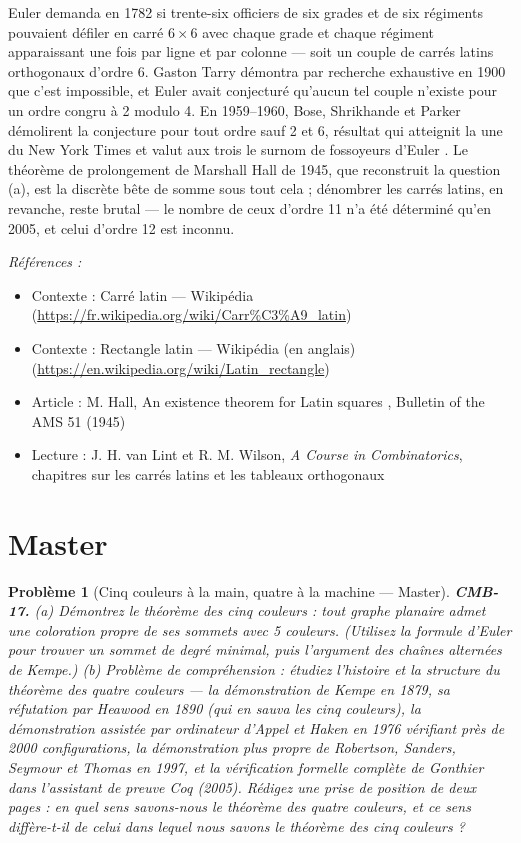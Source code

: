 \documentclass[11pt]{article}
\newtheorem{problem}{Problème}
\newenvironment{refs}{\par\small\noindent\emph{Références :}\begin{itemize}\setlength\itemsep{0pt}}{\end{itemize}\normalsize}
\begin{document}
\noindent Euler demanda en 1782 si trente-six officiers de six grades et de six régiments pouvaient défiler en carré $ 6 \times 6 $ avec chaque grade et chaque régiment apparaissant une fois par ligne et par colonne --- soit un couple de carrés latins orthogonaux d'ordre 6. Gaston Tarry démontra par recherche exhaustive en 1900 que c'est impossible, et Euler avait conjecturé qu'aucun tel couple n'existe pour un ordre congru à 2 modulo 4. En 1959--1960, Bose, Shrikhande et Parker démolirent la conjecture pour tout ordre sauf 2 et 6, résultat qui atteignit la une du New York Times et valut aux trois le surnom de \og{} fossoyeurs d'Euler \fg{}. Le théorème de prolongement de Marshall Hall de 1945, que reconstruit la question (a), est la discrète bête de somme sous tout cela ; dénombrer les carrés latins, en revanche, reste brutal --- le nombre de ceux d'ordre 11 n'a été déterminé qu'en 2005, et celui d'ordre 12 est inconnu.

\begin{refs}
\item Contexte : Carré latin --- Wikipédia (\url{https://fr.wikipedia.org/wiki/Carr%C3%A9_latin})
\item Contexte : Rectangle latin --- Wikipédia (en anglais) (\url{https://en.wikipedia.org/wiki/Latin_rectangle})
\item Article : M. Hall, \og{} An existence theorem for Latin squares \fg{}, Bulletin of the AMS 51 (1945)
\item Lecture : J. H. van Lint et R. M. Wilson, \textit{A Course in Combinatorics}, chapitres sur les carrés latins et les tableaux orthogonaux
\end{refs}

\bigskip


\section*{Master}

\begin{problem}[{Cinq couleurs à la main, quatre à la machine --- Master}]
\textbf{CMB-17.} (a) Démontrez le théorème des cinq couleurs : tout graphe
planaire admet une coloration propre de ses sommets avec 5 couleurs. (Utilisez la formule d'Euler
pour trouver un sommet de degré minimal, puis l'argument des chaînes alternées de Kempe.)
(b) Problème de compréhension : étudiez l'histoire et la structure du théorème des quatre couleurs
--- la \og{} démonstration \fg{} de Kempe en 1879, sa réfutation par Heawood en 1890 (qui en sauva les cinq
couleurs), la démonstration assistée par ordinateur d'Appel et Haken en 1976 vérifiant près de
2000 configurations, la démonstration plus propre de Robertson, Sanders, Seymour et Thomas en
1997, et la vérification formelle complète de Gonthier dans l'assistant de preuve Coq (2005).
Rédigez une prise de position de deux pages : en quel sens \textit{savons}-nous le théorème des
quatre couleurs, et ce sens diffère-t-il de celui dans lequel nous savons le théorème des cinq
couleurs ?
\end{problem}
\end{document}
